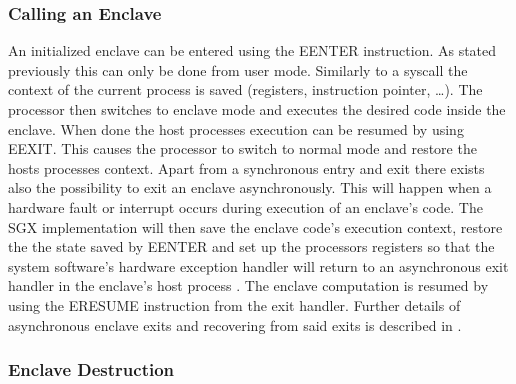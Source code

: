 \subsubsection{Calling an Enclave}
An initialized enclave can be entered using the EENTER instruction. As stated previously this can only be done from user mode. Similarly to a syscall the context of the current
process is saved (registers, instruction pointer, \dots). The processor then switches to enclave mode and executes the desired code inside the enclave. When done the host processes
execution can be resumed by using EEXIT. This causes the processor to switch to normal mode and restore the hosts processes context. Apart from a synchronous entry and exit there
exists also the possibility to exit an enclave asynchronously. This will happen when a hardware fault or interrupt occurs during execution of an enclave's code. The SGX
implementation will then save the enclave code's execution context, restore the the state saved by EENTER and set up the processors registers so that the system software’s hardware 
exception handler will return to an asynchronous exit handler in the enclave’s host process \cite{Costan2016IntelSE}. The enclave computation is resumed by using the ERESUME
instruction from the exit handler. Further details of asynchronous enclave exits and recovering from said exits is described in \cite{Costan2016IntelSE}.

\subsubsection{Enclave Destruction}
